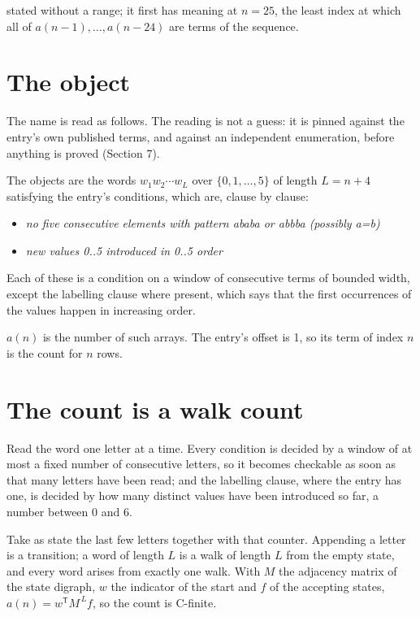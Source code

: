 \documentclass[11pt]{article}
\theoremstyle{definition}
\begin{document}
stated without a range; it first has meaning at $n = 25$, the least index at which all of $a(n-1),\dots,a(n-24)$ are terms of the sequence.

\section{The object}

The name is read as follows. The reading is not a guess: it is pinned against the entry's own published terms, and against an independent enumeration, before anything is proved (Section 7).

The objects are the words $w_1 w_2 \cdots w_L$ over $\{0,1,\dots,5\}$ of length $L = n + 4$ satisfying the entry's conditions, which are, clause by clause:

\begin{itemize}

\item {\itshape no five consecutive elements with pattern ababa or abbba (possibly a=b)}

\item {\itshape new values 0..5 introduced in 0..5 order}

\end{itemize}

Each of these is a condition on a window of consecutive terms of bounded width, except the labelling clause where present, which says that the first occurrences of the values happen in increasing order.

$a(n)$ is the number of such arrays. The entry's offset is 1, so its term of index $n$ is the count for $n$ rows.

\section{The count is a walk count}

Read the word one letter at a time. Every condition is decided by a window of at most a fixed number of consecutive letters, so it becomes checkable as soon as that many letters have been read; and the labelling clause, where the entry has one, is decided by how many distinct values have been introduced so far, a number between $0$ and 6.

Take as state the last few letters together with that counter. Appending a letter is a transition; a word of length $L$ is a walk of length $L$ from the empty state, and every word arises from exactly one walk. With $M$ the adjacency matrix of the state digraph, $w$ the indicator of the start and $f$ of the accepting states, $a(n) = w^{\mathsf T}M^{\,L}f$, so the count is C-finite.
\end{document}
